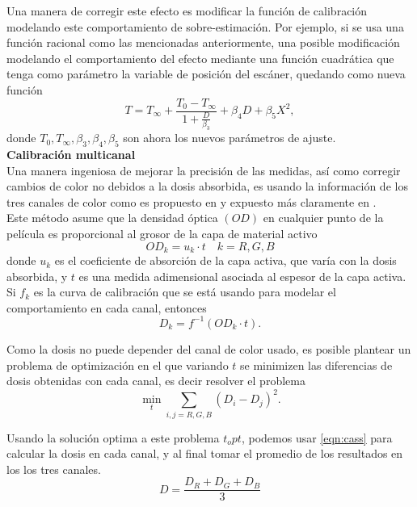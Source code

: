 Una manera de corregir este efecto es modificar la función de calibración modelando este comportamiento de sobre-estimación. Por ejemplo, si se usa una función racional como las mencionadas anteriormente, una posible modificación modelando el comportamiento del efecto mediante una función cuadrática que tenga como parámetro la variable de posición del escáner, quedando como nueva función
\begin{equation}
	T=T_{\infty}+\frac{T_0-T_{\infty}}{1+\frac{D}{\beta_{3}}}+\beta_{4}D+\beta_{5}X^2,
\end{equation}
donde $T_0, T_{\infty},\beta_{3},\beta_{4},\beta_{5}$ son ahora los nuevos parámetros de ajuste.\\


\textbf{Calibración multicanal}\\

Una manera ingeniosa de mejorar la precisión de las medidas, así como corregir cambios de color no debidos a la dosis absorbida, es usando la información de los tres canales de color como es propuesto en \cite{Micke2011} y expuesto más claramente en \cite{Li2017}. \\

Este método asume que la densidad óptica $(OD)$ en cualquier punto de la película es proporcional al grosor de la capa de material activo
\begin{equation}
	OD_{k}=u_{k}\cdot t \quad k=R,G,B
\end{equation} 
donde $u_k$ es el coeficiente de absorción de la capa activa, que varía con la dosis absorbida, y $t$ es una medida adimensional asociada al espesor de la capa activa. Si $f_k$ es la curva de calibración que se está usando para modelar el comportamiento en cada canal, entonces 
\begin{equation}
\label{eqn:cass}
	D_k=f^{-1}(OD_k\cdot t).
\end{equation}

Como la dosis no puede depender del canal de color usado, es posible plantear un problema de optimización en el que variando $t$ se minimizen las diferencias de dosis obtenidas con cada canal, es decir resolver el problema
\begin{equation}
	\min_{t}\sum_{i,j=R,G,B}(D_i-D_j)^2.
\end{equation}

Usando la solución optima a este problema $t_opt$, podemos usar \eqref{eqn:cass} para calcular la dosis en cada canal, y al final tomar el promedio de los resultados en los los tres canales.
\begin{equation}
	D=\frac{D_R+D_G+D_B}{3}
\end{equation}



